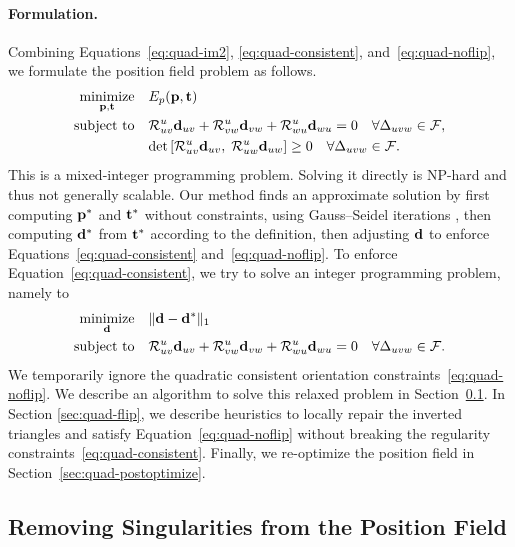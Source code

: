 \paragraph*{Formulation.}
Combining Equations~\eqref{eq:quad-im2}, \eqref{eq:quad-consistent}, and~\eqref{eq:quad-noflip}, we formulate the position field problem as follows.
\begin{align*}
\operatorname*{minimize}_{\mathbf{p}, \mathbf{t}} \quad & E_p(\mathbf{p}, \mathbf{t})\\
\text{subject to} \quad & \mathcal{R}^u_{uv}{\mathbf{d}}_{uv} + \mathcal{R}^u_{vw}{\mathbf{d}}_{vw} + \mathcal{R}^u_{wu}{\mathbf{d}}_{wu} = 0 \quad \forall \Delta_{uvw} \in \mathcal{F},  \\
                   & \text{det} \left[\mathcal{R}^u_{uv}{\mathbf{d}}_{uv},\;\mathcal{R}^u_{uw}{\mathbf{d}}_{uw}\right]\geq 0 \quad \forall \Delta_{uvw} \in \mathcal{F}.
\end{align*}
This is a mixed-integer programming problem. Solving it directly is NP-hard and thus not generally scalable. Our method finds an approximate solution by first computing $\mathbf{p}^*$ and $\mathbf{t}^*$ without constraints, using Gauss--Seidel iterations \cite{jakob2015instant}, then computing $\mathbf{d}^*$ from $\mathbf{t}^*$ according to the definition, then adjusting $\mathbf{d}$ to enforce Equations~\eqref{eq:quad-consistent} and~\eqref{eq:quad-noflip}. To enforce Equation~\eqref{eq:quad-consistent}, we try to solve an integer programming problem, namely to
\begin{align}
\operatorname*{minimize}_{\mathbf{d}} \quad & \lVert \mathbf{d}-\mathbf{d}^*\rVert_1 \label{eq:quad-formulation} \\
\text{subject to} \quad &
\mathcal{R}^u_{uv}{\mathbf{d}}_{uv} + \mathcal{R}^u_{vw}{\mathbf{d}}_{vw} + \mathcal{R}^u_{wu}{\mathbf{d}}_{wu} = 0 \quad \forall \Delta_{uvw} \in \mathcal{F}.\nonumber
\end{align}
We temporarily ignore the quadratic consistent orientation constraints~\eqref{eq:quad-noflip}. We describe an algorithm to solve this relaxed problem in Section~\ref{sec:quad-maxflow}.   In Section \ref{sec:quad-flip}, we describe heuristics to locally repair the inverted triangles and satisfy Equation~\eqref{eq:quad-noflip} without breaking the regularity constraints~\eqref{eq:quad-consistent}.  Finally, we re-optimize the position field in Section~\ref{sec:quad-postoptimize}.

\subsection{Removing Singularities from the Position Field}
\label{sec:quad-maxflow}

